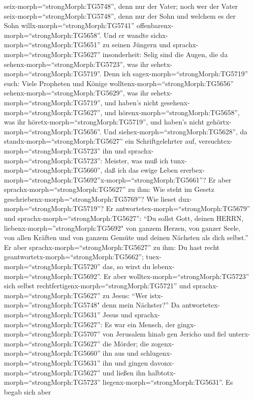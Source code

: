 seix-morph=``strongMorph:TG5748'', denn nur der Vater; noch wer der
Vater seix-morph=``strongMorph:TG5748'', denn nur der Sohn und welchem
es der Sohn willx-morph=``strongMorph:TG5741''
offenbarenx-morph=``strongMorph:TG5658''.  Und er wandte
sichx-morph=``strongMorph:TG5651'' zu seinen Jüngern und
sprachx-morph=``strongMorph:TG5627'' insonderheit: Selig sind die Augen,
die da sehenx-morph=``strongMorph:TG5723'', was ihr
sehetx-morph=``strongMorph:TG5719''.  Denn ich
sagex-morph=``strongMorph:TG5719'' euch: Viele Propheten und Könige
wolltenx-morph=``strongMorph:TG5656''
sehenx-morph=``strongMorph:TG5629'', was ihr
sehetx-morph=``strongMorph:TG5719'', und haben's nicht
gesehenx-morph=``strongMorph:TG5627'', und
hörenx-morph=``strongMorph:TG5658'', was ihr
höretx-morph=``strongMorph:TG5719'', und haben's nicht
gehörtx-morph=``strongMorph:TG5656''.  Und
siehex-morph=``strongMorph:TG5628'', da
standx-morph=``strongMorph:TG5627'' ein Schriftgelehrter auf,
versuchtex-morph=``strongMorph:TG5723'' ihn und
sprachx-morph=``strongMorph:TG5723'': Meister, was muß ich
tunx-morph=``strongMorph:TG5660'', daß ich das ewige Leben
ererbex-morph=``strongMorph:TG5692''\textbar x-morph=``strongMorph:TG5661''?
 Er aber sprachx-morph=``strongMorph:TG5627'' zu ihm: Wie
steht im Gesetz geschriebenx-morph=``strongMorph:TG5769''? Wie lieset
dux-morph=``strongMorph:TG5719''?  Er
antwortetex-morph=``strongMorph:TG5679'' und
sprachx-morph=``strongMorph:TG5627'': ``Du sollst Gott, deinen HERRN,
liebenx-morph=''strongMorph:TG5692" von ganzem Herzen, von ganzer Seele,
von allen Kräften und von ganzem Gemüte und deinen Nächsten als dich
selbst.''  Er aber sprachx-morph=``strongMorph:TG5627'' zu
ihm: Du hast recht geantwortetx-morph=``strongMorph:TG5662'';
tuex-morph=``strongMorph:TG5720'' das, so wirst du
lebenx-morph=``strongMorph:TG5692''.  Er aber
wolltex-morph=``strongMorph:TG5723'' sich selbst
rechtfertigenx-morph=``strongMorph:TG5721'' und
sprachx-morph=``strongMorph:TG5627'' zu Jesus: ``Wer
istx-morph=''strongMorph:TG5748" denn mein Nächster?''  Da
antwortetex-morph=``strongMorph:TG5631'' Jesus und
sprachx-morph=``strongMorph:TG5627'': Es war ein Mensch, der
gingx-morph=``strongMorph:TG5707'' von Jerusalem hinab gen Jericho und
fiel unterx-morph=``strongMorph:TG5627'' die Mörder; die
zogenx-morph=``strongMorph:TG5660'' ihn aus und
schlugenx-morph=``strongMorph:TG5631'' ihn und gingen
davonx-morph=``strongMorph:TG5627'' und ließen ihn
halbtotx-morph=``strongMorph:TG5723''
liegenx-morph=``strongMorph:TG5631''.  Es begab sich aber
